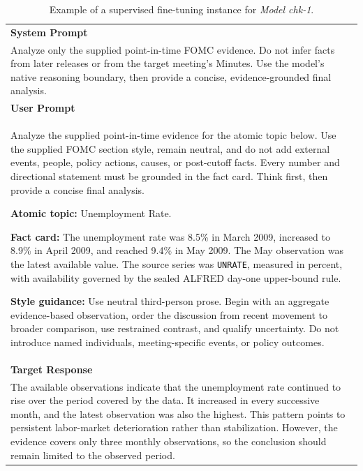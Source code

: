 \begin{table}[!tbp]
\centering
\footnotesize
\caption{Example of a supervised fine-tuning instance for \textit{Model chk-1}.}
\label{tab:chk1-sft-example}
\renewcommand{\arraystretch}{1.25}
\setlength{\tabcolsep}{8pt}

\begin{tabularx}{\textwidth}{@{}
    >{\raggedright\arraybackslash}X
@{}}
\toprule

\textbf{System Prompt} \\[2pt]
Analyze only the supplied point-in-time FOMC evidence.
Do not infer facts from later releases or from the target meeting's Minutes.
Use the model's native reasoning boundary, then provide a concise,
evidence-grounded final analysis.
\\

\midrule

\textbf{User Prompt} \\[2pt]
Analyze the supplied point-in-time evidence for the atomic topic below.
Use the supplied FOMC section style, remain neutral, and do not add external
events, people, policy actions, causes, or post-cutoff facts.
Every number and directional statement must be grounded in the fact card.
Think first, then provide a concise final analysis.

\par\medskip
\textbf{Atomic topic:} Unemployment Rate.

\par\smallskip
\textbf{Fact card:}
The unemployment rate was 8.5\% in March 2009, increased to 8.9\% in April
2009, and reached 9.4\% in May 2009. The May observation was the latest
available value. The source series was \texttt{UNRATE}, measured in percent,
with availability governed by the sealed ALFRED day-one upper-bound rule.

\par\smallskip
\textbf{Style guidance:}
Use neutral third-person prose. Begin with an aggregate evidence-based
observation, order the discussion from recent movement to broader comparison,
use restrained contrast, and qualify uncertainty. Do not introduce named
individuals, meeting-specific events, or policy outcomes.
\\

\midrule

\textbf{Target Response} \\[2pt]
The available observations indicate that the unemployment rate continued to
rise over the period covered by the data. It increased in every successive
month, and the latest observation was also the highest. This pattern points to
persistent labor-market deterioration rather than stabilization. However, the
evidence covers only three monthly observations, so the conclusion should
remain limited to the observed period.


\end{tabularx}
\end{table}
